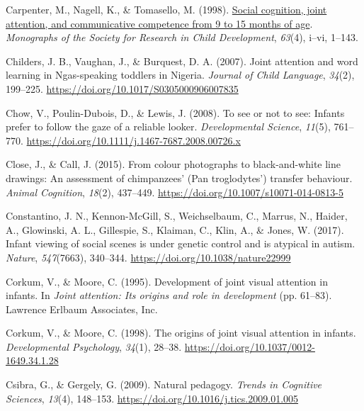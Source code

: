 \documentclass[
]{scrbook}
\newlength{\cslhangindent}
\newenvironment{CSLReferences}[2] %
 {\begin{list}{}{%
  \setlength{\itemindent}{0pt}
  \setlength{\leftmargin}{0pt}
  \setlength{\parsep}{0pt}
  \ifodd #1
   \setlength{\leftmargin}{\cslhangindent}
   \setlength{\itemindent}{-1\cslhangindent}
  \fi
  \setlength{\itemsep}{#2\baselineskip}}}
 {\end{list}}
\begin{document}
\begin{CSLReferences}{1}{0}
Carpenter, M., Nagell, K., \& Tomasello, M. (1998). \href{https://www.ncbi.nlm.nih.gov/pubmed/9835078}{Social cognition, joint attention, and communicative competence from 9 to 15 months of age}. \emph{Monographs of the Society for Research in Child Development}, \emph{63}(4), i--vi, 1--143.

Childers, J. B., Vaughan, J., \& Burquest, D. A. (2007). Joint attention and word learning in {Ngas-speaking} toddlers in {Nigeria}. \emph{Journal of Child Language}, \emph{34}(2), 199--225. \url{https://doi.org/10.1017/S0305000906007835}

Chow, V., Poulin-Dubois, D., \& Lewis, J. (2008). To see or not to see: Infants prefer to follow the gaze of a reliable looker. \emph{Developmental Science}, \emph{11}(5), 761--770. \url{https://doi.org/10.1111/j.1467-7687.2008.00726.x}

Close, J., \& Call, J. (2015). From colour photographs to black-and-white line drawings: An assessment of chimpanzees' ({Pan} troglodytes') transfer behaviour. \emph{Animal Cognition}, \emph{18}(2), 437--449. \url{https://doi.org/10.1007/s10071-014-0813-5}

Constantino, J. N., Kennon-McGill, S., Weichselbaum, C., Marrus, N., Haider, A., Glowinski, A. L., Gillespie, S., Klaiman, C., Klin, A., \& Jones, W. (2017). Infant viewing of social scenes is under genetic control and is atypical in autism. \emph{Nature}, \emph{547}(7663), 340--344. \url{https://doi.org/10.1038/nature22999}

Corkum, V., \& Moore, C. (1995). Development of joint visual attention in infants. In \emph{Joint attention: {Its} origins and role in development} (pp. 61--83). Lawrence Erlbaum Associates, Inc.

Corkum, V., \& Moore, C. (1998). The origins of joint visual attention in infants. \emph{Developmental Psychology}, \emph{34}(1), 28--38. \url{https://doi.org/10.1037/0012-1649.34.1.28}

Csibra, G., \& Gergely, G. (2009). Natural pedagogy. \emph{Trends in Cognitive Sciences}, \emph{13}(4), 148--153. \url{https://doi.org/10.1016/j.tics.2009.01.005}


\end{CSLReferences}
\end{document}

